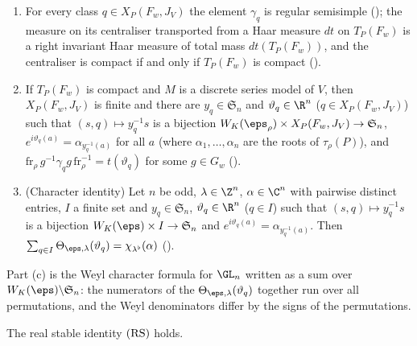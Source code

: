 \begin{lemma}\label{pf:multnc:realtori}
\begin{enumerate}[label=(\alph*)]
\item For every class $q\in X_P(F_w,J_V)$ the element $\gamma_q$ is regular semisimple
(); the measure on its centraliser
transported from a Haar measure $dt$ on $T_P(F_w)$ is a right invariant Haar measure of total mass $dt(T_P(F_w))$, and the
centraliser is compact if and only if $T_P(F_w)$ is compact
().
\item If $T_P(F_w)$ is compact and $M$ is a discrete series model of $V$, then $X_P(F_w,J_V)$ is finite and there are
$y_q\in\mathfrak S_n$ and $\vartheta_q\in\R^n$ ($q\in X_P(F_w,J_V)$) such that $(s,q)\mapsto y_q^{-1}s$ is a bijection
$W_K(\eps_\rho)\times X_P(F_w,J_V)\to\mathfrak S_n$, $e^{i\vartheta_q(a)}=\alpha_{y_q^{-1}(a)}$ for all $a$ (where
$\alpha_1,\dots,\alpha_n$ are the roots of $\tau_\rho(P)$), and $\mathrm{fr}_\rho\,g^{-1}\gamma_qg\,\mathrm{fr}_\rho^{-1}=
t(\vartheta_q)$ for some $g\in G_w$ ().
\item (Character identity) Let $n$ be odd, $\lambda\in\Z^n$, $\alpha\in\C^n$ with pairwise distinct entries, $I$ a finite
set and $y_q\in\mathfrak S_n$, $\vartheta_q\in\R^n$ ($q\in I$) such that $(s,q)\mapsto y_q^{-1}s$ is a bijection
$W_K(\eps)\times I\to\mathfrak S_n$ and $e^{i\vartheta_q(a)}=\alpha_{y_q^{-1}(a)}$. Then
$\sum_{q\in I}\Theta_{\eps,\lambda}(\vartheta_q)=\chi_{\lambda^\flat}(\alpha)$
().
\end{enumerate}
\end{lemma}

Part (c) is the Weyl character formula for $\GL_n$ written as a sum over $W_K(\eps)\backslash\mathfrak S_n$: the numerators
of the $\Theta_{\eps,\lambda}(\vartheta_q)$ together run over all permutations, and the Weyl denominators differ by the
signs of the permutations.

\begin{proposition}\label{pf:multnc:realstable}
The real stable identity $\textup{(RS)}$ holds.
\end{proposition}

